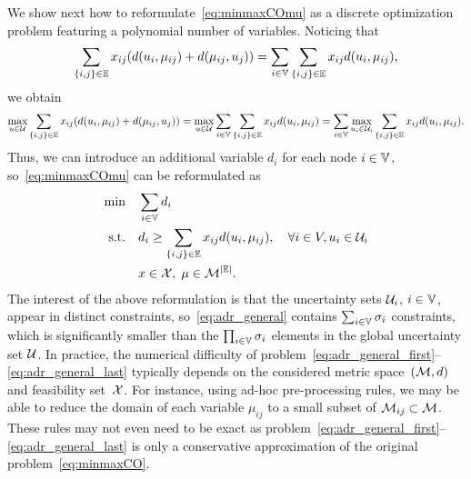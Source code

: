 \documentclass[12pt]{article}
\begin{document}
We show next how to reformulate~\ref{eq:minmaxCOmu} as a discrete optimization problem featuring a polynomial number of variables. Noticing that 
$$
\sum_{\{i,j\}\in \mathbb{E}} x_{ij}(d(u_i,\mu_{ij})+d(\mu_{ij},u_j))
=
\sum_{i\in \mathbb{V}} \sum_{\{i,j\}\in \mathbb{E}} x_{ij}d(u_i,\mu_{ij}),
$$
we obtain
$$
\max_{u\in\mathcal{U}}\sum_{\{i,j\}\in \mathbb{E}} x_{ij}(d(u_i,\mu_{ij})+d(\mu_{ij},u_j))
=
\max_{u\in\mathcal{U}}\sum_{i\in \mathbb{V}} \sum_{\{i,j\}\in \mathbb{E}} x_{ij}d(u_i,\mu_{ij})
=
\sum_{i\in \mathbb{V}} \max_{u_i\in\mathcal{U}_i}\sum_{\{i,j\}\in \mathbb{E}} x_{ij}d(u_i,\mu_{ij}).
$$
Thus, we can introduce an additional variable $d_i$ for each node $i\in \mathbb{V}$, so~\ref{eq:minmaxCOmu} can be reformulated as
 \begin{align}
\min\quad & \sum_{i\in \mathbb{V}}d_i \label{eq:adr_general_first}\\
\mbox{s.t.}\quad & d_i \geq \sum_{\{i,j\}\in \mathbb{E}} x_{ij}d(u_i,\mu_{ij}), \quad\forall i\in V,u_i\in \mathcal{U}_i\label{eq:adr_general}\\
& x \in \mathcal{X}, \;\mu\in\mathcal{M}^{|\mathbb{E}|}. \label{eq:adr_general_last}
\end{align}
The interest of the above reformulation is that the uncertainty sets $\mathcal{U}_i$, $i\in\mathbb{V}$, appear in distinct constraints, so~\eqref{eq:adr_general} contains $\sum_{i\in \mathbb{V}}{\sigma_{i}}$ constraints, which is significantly smaller than the $\prod_{i\in \mathbb{V}}{\sigma_{i}}$ elements in the global uncertainty set $\mathcal{U}$. 
In practice, the numerical difficulty of problem~\eqref{eq:adr_general_first}--\eqref{eq:adr_general_last} typically depends on the considered metric space~$(\mathcal{M},d)$ and feasibility set~$\mathcal{X}$. For instance, using ad-hoc pre-processing rules, we may be able to reduce the domain of each variable $\mu_{ij}$ to a small subset of $\mathcal{M}_{ij}\subset\mathcal{M}$. These rules may not even need to be exact as problem~\eqref{eq:adr_general_first}--\eqref{eq:adr_general_last} is only a conservative approximation of the original problem~\ref{eq:minmaxCO}.
\end{document}
